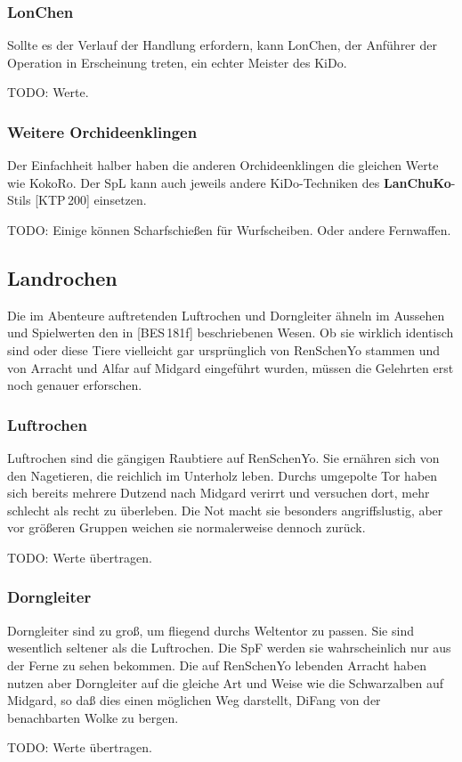 \documentclass[
a4paper,
twoside,
DIV=calc,
BCOR=4mm,
fontsize=9pt,
twocolumn=on,
titlepage=on,
parskip=half
]{scrartcl}
\begin{document}
\subsubsection{LonChen}

Sollte es der Verlauf der Handlung erfordern, kann LonChen, der
Anführer der Operation in Erscheinung treten, ein echter Meister des
KiDo.

TODO: Werte.

\subsubsection{Weitere Orchideenklingen}

Der Einfachheit halber haben die anderen Orchideenklingen die
gleichen Werte wie KokoRo. Der SpL kann auch jeweils andere
KiDo-Techniken des \textbf{LanChuKo}-Stils [KTP\,200] einsetzen.

TODO: Einige können Scharfschießen für Wurfscheiben. Oder andere
Fernwaffen.

\subsection{Landrochen}

Die im Abenteure auftretenden Luftrochen und Dorngleiter ähneln im
Aussehen und Spielwerten den in [BES\,181f] beschriebenen Wesen. Ob
sie wirklich identisch sind oder diese Tiere vielleicht gar
ursprünglich von RenSchenYo stammen und von Arracht und Alfar auf
Midgard eingeführt wurden, müssen die Gelehrten erst noch genauer
erforschen.

\subsubsection{Luftrochen}

Luftrochen sind die gängigen Raubtiere auf RenSchenYo. Sie ernähren
sich von den Nagetieren, die reichlich im Unterholz leben. Durchs
umgepolte Tor haben sich bereits mehrere Dutzend nach Midgard verirrt
und versuchen dort, mehr schlecht als recht zu überleben. Die Not
macht sie besonders angriffslustig, aber vor größeren Gruppen weichen
sie normalerweise dennoch zurück.

TODO: Werte übertragen.

\subsubsection{Dorngleiter}

Dorngleiter sind zu groß, um fliegend durchs Weltentor zu passen. Sie
sind wesentlich seltener als die Luftrochen. Die SpF werden sie
wahrscheinlich nur aus der Ferne zu sehen bekommen. Die auf RenSchenYo
lebenden Arracht haben nutzen aber Dorngleiter auf die gleiche Art und
Weise wie die Schwarzalben auf Midgard, so daß dies einen möglichen
Weg darstellt, DiFang von der benachbarten Wolke zu bergen.

TODO: Werte übertragen.
\end{document}
